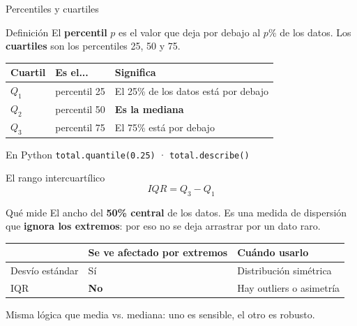 \documentclass[aspectratio=169,10pt]{beamer}
\begin{document}
\begin{frame}{Percentiles y cuartiles}
  \begin{block}{Definición}
    El \textbf{percentil} $p$ es el valor que deja por debajo al $p\%$ de los datos.
    Los \textbf{cuartiles} son los percentiles 25, 50 y 75.
  \end{block}
  \vspace{0.3em}
  \begin{center}
  \begin{tabular}{lll}
    \toprule
    \textbf{Cuartil} & \textbf{Es el...} & \textbf{Significa} \\
    \midrule
    $Q_1$ & percentil 25 & El 25\% de los datos está por debajo \\
    $Q_2$ & percentil 50 & \textbf{Es la mediana} \\
    $Q_3$ & percentil 75 & El 75\% está por debajo \\
    \bottomrule
  \end{tabular}
  \end{center}
  \vspace{0.5em}
  \begin{exampleblock}{En Python}
    \texttt{total.quantile(0.25)} \quad · \quad \texttt{total.describe()}
  \end{exampleblock}
\end{frame}

\begin{frame}{El rango intercuartílico}
  \[ IQR = Q_3 - Q_1 \]
  \begin{block}{Qué mide}
    El ancho del \textbf{50\% central} de los datos. Es una medida de dispersión que
    \textbf{ignora los extremos}: por eso no se deja arrastrar por un dato raro.
  \end{block}
  \vspace{0.4em}
  \begin{center}
  \begin{tabular}{lll}
    \toprule
    & \textbf{Se ve afectado por extremos} & \textbf{Cuándo usarlo} \\
    \midrule
    Desvío estándar & Sí                 & Distribución simétrica \\
    IQR             & \textbf{No}        & Hay outliers o asimetría \\
    \bottomrule
  \end{tabular}
  \end{center}
  \vspace{0.4em}
  \begin{center}\small Misma lógica que media vs. mediana: uno es sensible, el otro es robusto.\end{center}
\end{frame}
\end{document}
